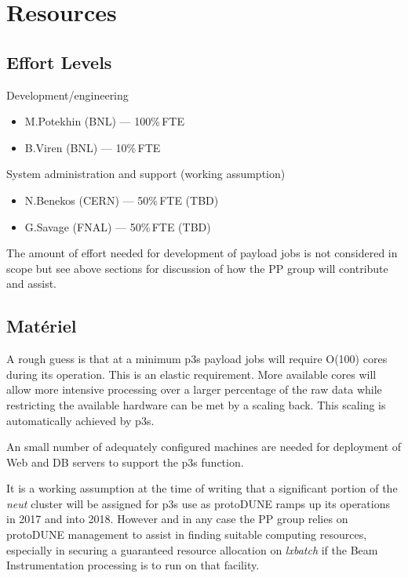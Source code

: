 \documentclass[pdftex,12pt,letter]{article}
\newcommand{\pd}{protoDUNE\xspace}
\begin{document}
\section{Resources}
\label{sec:resources}

\subsection{Effort Levels}

Development/engineering
\begin{itemize}
\item M.Potekhin (BNL) --- 100\%\,FTE
\item B.Viren (BNL) --- 10\%\,FTE
\end{itemize}

\noindent System administration and support (working assumption)

\begin{itemize}
\item N.Benekos (CERN) --- 50\%\,FTE (TBD)
\item G.Savage (FNAL) --- 50\%\,FTE (TBD)
\end{itemize}

\noindent The amount of effort needed for development of payload jobs
is not considered in scope but see above sections for discussion of
how the PP group will contribute and assist.

\subsection{Mat\'eriel}

A rough guess is that at a minimum p3s payload jobs will require O(100) cores
during its operation.  This is an elastic requirement.  More available
cores will allow more intensive processing over a larger percentage of
the raw data while restricting the available hardware can be met by a
scaling back.  This scaling is automatically achieved by p3s.

An small number of adequately configured machines are needed for
deployment of Web and DB servers to support the p3s function.  

It is a working assumption at the time of writing that a significant
portion of the \textit{neut} cluster \cite{neut} will be assigned for
p3s use as \pd ramps up its operations in 2017 and into 2018.  However
and in any case the PP group relies on \pd management to assist in
finding suitable computing resources, especially in securing a guaranteed
resource allocation on \textit{lxbatch} if the Beam Instrumentation
processing is to run on that facility.
\end{document}
